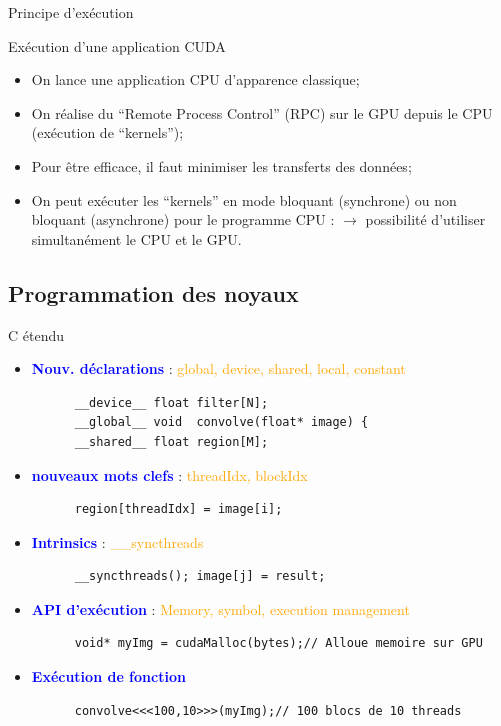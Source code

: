 \documentclass[handout,francais]{beamer}
\begin{document}
\begin{frame}{Principe d'exécution}
\begin{exampleblock}{Exécution d'une application CUDA}
\begin{itemize}
\item On lance une application CPU d'apparence classique;
\item On réalise du ``Remote Process Control'' (RPC) sur le GPU depuis le CPU
(exécution de ``kernels'');
\item Pour être efficace, il faut minimiser les transferts des données;
\item On peut exécuter les ``kernels'' en mode bloquant (synchrone) ou 
  non bloquant (asynchrone) pour le programme CPU :
  $\rightarrow$ possibilité d'utiliser simultanément le CPU et le GPU.
\end{itemize}
\end{exampleblock}


\end{frame}

\subsection{Programmation des noyaux}

\begin{frame}[containsverbatim]{C étendu}
\scriptsize
  \begin{itemize}
  \item \textbf{\textcolor{blue}{Nouv. déclarations}} : \textcolor{orange}{\small global, device, shared, local, constant}
    \begin{lstlisting}
      __device__ float filter[N];
      __global__ void  convolve(float* image) {
      __shared__ float region[M];
    \end{lstlisting}
  \item \textbf{\textcolor{blue}{nouveaux mots clefs}} : 
    \textcolor{orange}{\small threadIdx, blockIdx}
    \begin{lstlisting}
      region[threadIdx] = image[i];
    \end{lstlisting}
  \item \textbf{\textcolor{blue}{Intrinsics}} : 
    \textcolor{orange}{\small \_\_syncthreads}
    \begin{lstlisting}
      __syncthreads(); image[j] = result;
  \end{lstlisting}
  \item \textbf{\textcolor{blue}{API d'exécution}} :
    \textcolor{orange}{\small Memory, symbol, execution management}
    \begin{lstlisting}
      void* myImg = cudaMalloc(bytes);// Alloue memoire sur GPU
    \end{lstlisting}
  \item \textcolor{blue}{\bf Exécution de fonction}
    \begin{lstlisting}
      convolve<<<100,10>>>(myImg);// 100 blocs de 10 threads
    \end{lstlisting}
  \end{itemize}
\end{frame}
\end{document}
